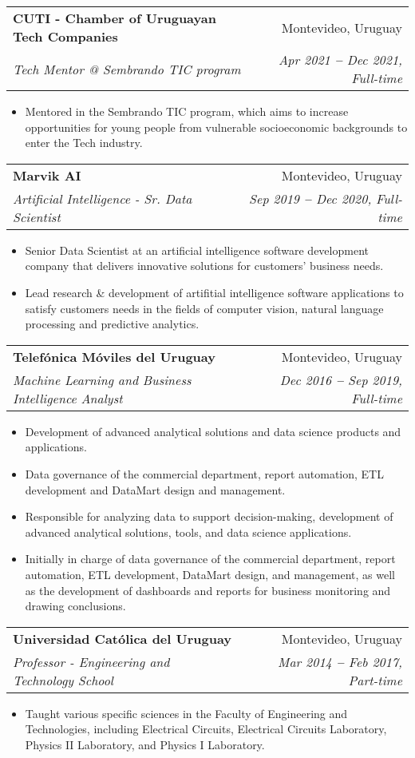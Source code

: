 \documentclass[letterpaper,11pt]{article}
\makeatletter
\newcommand{\resumeItem}[1]{
  \item\small{
    {#1 \vspace{-2pt}}
  }
}
\newcommand{\resumeSubheading}[4]{
  \vspace{-2pt}\item
  \begin{tabular*}{0.97\textwidth}[t]{l@{\extracolsep{\fill}}r}
    \textbf{#1} & #2 \\
    \textit{\small#3} & \textit{\small #4} \\
  \end{tabular*}\vspace{-7pt}
}
\newcommand{\resumeItemListStart}{\begin{itemize}}
\newcommand{\resumeItemListEnd}{\end{itemize}\vspace{-5pt}}
\makeatother
\begin{document}
        \resumeSubheading
            {CUTI - Chamber of Uruguayan Tech Companies}{Montevideo, Uruguay}
            {Tech Mentor @ Sembrando TIC program}{Apr 2021 \textbf{--} Dec 2021, Full-time}
            \resumeItemListStart
                \resumeItem{Mentored in the Sembrando TIC program, which aims to increase opportunities for young people from vulnerable socioeconomic backgrounds to enter the Tech industry.}
            \resumeItemListEnd

        \resumeSubheading
            {Marvik AI}{Montevideo, Uruguay}
            {Artificial Intelligence - Sr. Data Scientist}{Sep 2019 \textbf{--} Dec 2020, Full-time}
            \resumeItemListStart
                \resumeItem{Senior Data Scientist at an artificial intelligence software development company that delivers innovative solutions for customers' business needs.}
                \resumeItem{Lead research \& development of artifitial intelligence software applications to satisfy customers needs in the fields of computer vision, natural language processing and predictive analytics.}
            \resumeItemListEnd

        \resumeSubheading
            {Telefónica Móviles del Uruguay}{Montevideo, Uruguay}
            {Machine Learning and Business Intelligence Analyst}{Dec 2016 \textbf{--} Sep 2019, Full-time}
            \resumeItemListStart
                \resumeItem{Development of advanced analytical solutions and data science products and applications.}
                \resumeItem{Data governance of the commercial department, report automation, ETL development and DataMart design and management.}
                \resumeItem{Responsible for analyzing data to support decision-making, development of advanced analytical solutions, tools, and data science applications.}
                \resumeItem{Initially in charge of data governance of the commercial department, report automation, ETL development, DataMart design, and management, as well as the development of dashboards and reports for business monitoring and drawing conclusions.}
            \resumeItemListEnd

        \resumeSubheading
            {Universidad Católica del Uruguay}{Montevideo, Uruguay}
            {Professor - Engineering and Technology School}{Mar 2014 \textbf{--} Feb 2017, Part-time}
            \resumeItemListStart
                \resumeItem{Taught various specific sciences in the Faculty of Engineering and Technologies, including Electrical Circuits, Electrical Circuits Laboratory, Physics II Laboratory, and Physics I Laboratory.}
            \resumeItemListEnd
\end{document}
